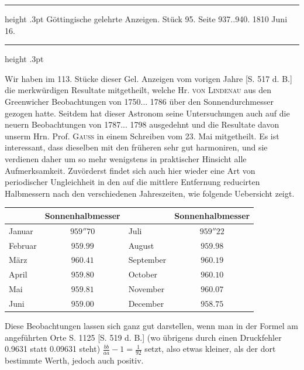 \par{}\bigskip
\hypertarget{native-530-lower}{}\label{native-530-lower}
\begin{center}
\parbox{.9\linewidth}{%
\centering\small
\hrule height .3pt\relax\vspace{2.5pt}
Göttingische gelehrte Anzeigen. Stück 95. Seite 937..940. 1810 Juni 16.\par
\vspace{2.5pt}\hrule height .3pt\relax
}
\end{center}
\par\nobreak\medskip

Wir haben im 113. Stücke dieser Gel. Anzeigen vom vorigen Jahre [S. 517 d. B.] die merkwürdigen Resultate mitgetheilt, welche Hr. \textsc{von Lindenau} aus den Greenwicher Beobachtungen von 1750... 1786 über den Sonnendurchmesser gezogen hatte. Seitdem hat dieser Astronom seine Untersuchungen auch auf die neuern Beobachtungen von 1787... 1798 ausgedehnt und die Resultate davon unserm Hrn. Prof. \textsc{Gauss} in einem Schreiben vom 23. Mai mitgetheilt. Es ist interessant, dass dieselben mit den früheren sehr gut harmoniren, und sie verdienen daher um so mehr wenigstens in praktischer Hinsicht alle Aufmerksamkeit. Zuvörderst findet sich auch hier wieder eine Art von periodischer Ungleichheit in den auf die mittlere Entfernung reducirten Halbmessern nach den verschiedenen Jahreszeiten, wie folgende Uebersicht zeigt.

\begin{center} \begin{tabular}{l|c||l|c} & Sonnenhalbmesser & & Sonnenhalbmesser \\ \hline Januar & $959''70$ & Juli & $959''22$ \\ Februar & $959.99$ & August & $959.98$ \\ März & $960.41$ & September & $960.19$ \\ April & $959.80$ & October & $960.10$ \\ Mai & $959.81$ & November & $960.07$ \\ Juni & $959.00$ & December & $958.75$ \\ \end{tabular} \end{center}

Diese Beobachtungen lassen sich ganz gut darstellen, wenn man in der Formel am angeführten Orte S. 1125 [S. 519 d. B.] (wo übrigens durch einen Druckfehler 0.9631 statt 0.09631 steht) $\frac{bb}{aa} - 1 = \frac{1}{92}$ setzt, also etwas kleiner, als der dort bestimmte Werth, jedoch auch positiv.

